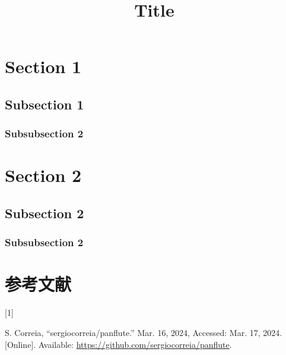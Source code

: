 \documentclass[
  10.5pt,
  a4paper,
  jafontscale=0.92,
  hanging_punctuation,
  head_space=24.8mm,
  foot_space=24.8mm]{jlreq}
\title{Title}
\author{}
\date{}
\newlength{\cslhangindent}
\newlength{\csllabelwidth}
\newenvironment{CSLReferences}[2] %
 {\begin{list}{}{%
  \setlength{\itemindent}{0pt}
  \setlength{\leftmargin}{0pt}
  \setlength{\parsep}{0pt}
  \ifodd #1
   \setlength{\leftmargin}{\cslhangindent}
   \setlength{\itemindent}{-1\cslhangindent}
  \fi
  \setlength{\itemsep}{#2\baselineskip}}}
 {\end{list}}
\newcommand{\CSLLeftMargin}[1]{\parbox[t]{\csllabelwidth}{\strut#1\strut}}
\newcommand{\CSLRightInline}[1]{\parbox[t]{\linewidth - \csllabelwidth}{\strut#1\strut}}
\begin{document}
\maketitle

\renewcommand*\contentsname{目次}
{
\hypersetup{linkcolor=Maroon}
\setcounter{tocdepth}{2}
\tableofcontents
}
\section{Section 1}\label{sec:1}

\subsection{Subsection 1}\label{subsection-1}

\subsubsection{Subsubsection 2}\label{subsubsection-2}


\section{Section 2}\label{sec:2}

\subsection{Subsection 2}\label{subsection-2}

\subsubsection{Subsubsection 2}\label{subsubsection-2-1}

\section*{参考文献}\label{bibliography}

\label{refs}
\begin{CSLReferences}{0}{0}
\CSLLeftMargin{{[}1{]} }%
\CSLRightInline{S. Correia, {``sergiocorreia/panflute.''} Mar. 16, 2024, Accessed: Mar. 17, 2024. {[}Online{]}. Available: \url{https://github.com/sergiocorreia/panflute}.}

\end{CSLReferences}
\end{document}
